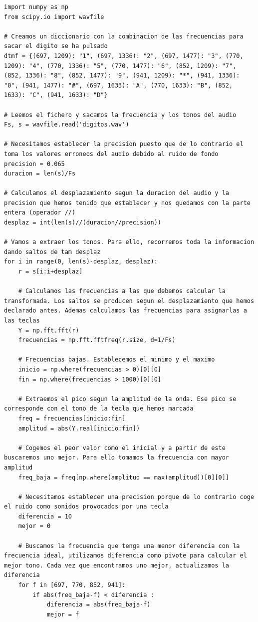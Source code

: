 \documentclass[11pt,a4paper]{article}
\begin{document}
\begin{lstlisting}
import numpy as np
from scipy.io import wavfile

# Creamos un diccionario con la combinacion de las frecuencias para sacar el digito se ha pulsado
dtmf = {(697, 1209): "1", (697, 1336): "2", (697, 1477): "3", (770, 1209): "4", (770, 1336): "5", (770, 1477): "6", (852, 1209): "7", (852, 1336): "8", (852, 1477): "9", (941, 1209): "*", (941, 1336): "0", (941, 1477): "#", (697, 1633): "A", (770, 1633): "B", (852, 1633): "C", (941, 1633): "D"}

# Leemos el fichero y sacamos la frecuencia y los tonos del audio
Fs, s = wavfile.read('digitos.wav')

# Necesitamos establecer la precision puesto que de lo contrario el toma los valores erroneos del audio debido al ruido de fondo
precision = 0.065
duracion = len(s)/Fs

# Calculamos el desplazamiento segun la duracion del audio y la precision que hemos tenido que establecer y nos quedamos con la parte entera (operador //)
desplaz = int(len(s)//(duracion//precision))

# Vamos a extraer los tonos. Para ello, recorremos toda la informacion dando saltos de tam desplaz
for i in range(0, len(s)-desplaz, desplaz):
    r = s[i:i+desplaz]

    # Calculamos las frecuencias a las que debemos calcular la transformada. Los saltos se producen segun el desplazamiento que hemos declarado antes. Ademas calculamos las frecuencias para asignarlas a las teclas
    Y = np.fft.fft(r)
    frecuencias = np.fft.fftfreq(r.size, d=1/Fs)

    # Frecuencias bajas. Establecemos el minimo y el maximo
    inicio = np.where(frecuencias > 0)[0][0]
    fin = np.where(frecuencias > 1000)[0][0]

    # Extraemos el pico segun la amplitud de la onda. Ese pico se corresponde con el tono de la tecla que hemos marcada
    freq = frecuencias[inicio:fin]
    amplitud = abs(Y.real[inicio:fin])

    # Cogemos el peor valor como el inicial y a partir de este buscaremos uno mejor. Para ello tomamos la frecuencia con mayor amplitud
    freq_baja = freq[np.where(amplitud == max(amplitud))[0][0]]

    # Necesitamos establecer una precision porque de lo contrario coge el ruido como sonidos provocados por una tecla
    diferencia = 10
    mejor = 0

    # Buscamos la frecuencia que tenga una menor diferencia con la frecuencia ideal, utilizamos diferencia como pivote para calcular el mejor tono. Cada vez que encontramos uno mejor, actualizamos la diferencia
    for f in [697, 770, 852, 941]:
        if abs(freq_baja-f) < diferencia :
            diferencia = abs(freq_baja-f)
            mejor = f


\end{lstlisting}
\end{document}

